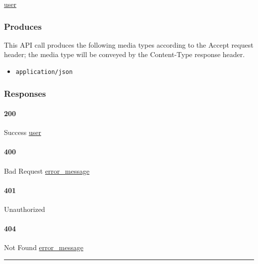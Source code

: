\protect\hyperlink{user}{user}

\hypertarget{produces-128}{%
\subsubsection{Produces}\label{produces-128}}

This API call produces the following media types according to the
{Accept} request header; the media type will be conveyed by the
{Content-Type} response header.

\begin{itemize}
\tightlist
\item
  \texttt{application/json}
\end{itemize}

\hypertarget{responses-131}{%
\subsubsection{Responses}\label{responses-131}}

\hypertarget{section-427}{%
\paragraph{200}\label{section-427}}

Success \protect\hyperlink{user}{user}

\hypertarget{section-428}{%
\paragraph{400}\label{section-428}}

Bad Request \protect\hyperlink{error_message}{error\_message}

\hypertarget{section-429}{%
\paragraph{401}\label{section-429}}

Unauthorized \protect\hyperlink{}{}

\hypertarget{section-430}{%
\paragraph{404}\label{section-430}}

Not Found \protect\hyperlink{error_message}{error\_message}

\begin{center}\rule{0.5\linewidth}{\linethickness}\end{center}

